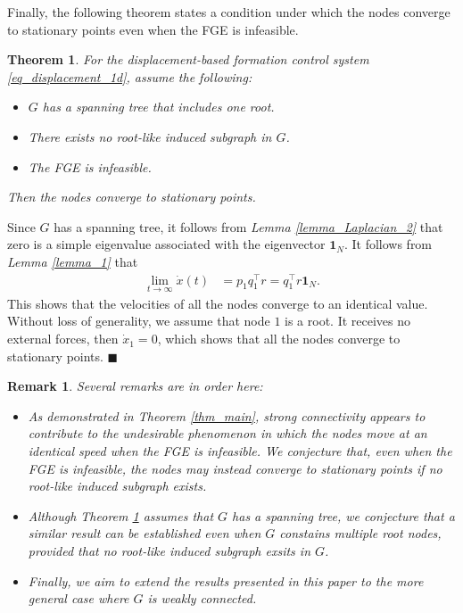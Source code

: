 \documentclass{ifacconf}
\newtheorem{remark}{Remark}[section]
\newtheorem{theorem}{Theorem}[section]
\begin{document}
Finally, the following theorem states a condition under which the nodes converge to stationary points even when the FGE is infeasible.
\begin{theorem} \label{thm_main_2}
For the displacement-based formation control system \eqref{eq_displacement_1d}, assume the following:
\begin{itemize}
\item $G$ has a spanning tree that includes one root.
\item There exists no root-like induced subgraph in $G$.
\item The FGE is infeasible.
\end{itemize}
Then the nodes converge to stationary points.
\end{theorem}
%
%
\begin{pf}
Since $G$ has a spanning tree, it follows from \textit{Lemma \ref{lemma_Laplacian_2}} that zero is a simple eigenvalue associated with the eigenvector $\mathbf{1}_N$. It follows from \textit{Lemma \ref{lemma_1}} that 
\begin{align*}
\lim_{t\rightarrow \infty} \dot{x}(t) &= p_1 q_1^\top r = q_1^\top r  \mathbf{1}_N.
\end{align*}
This shows that the velocities of all the nodes converge to an identical value. Without loss of generality, we assume that node $1$ is a root. It receives no external forces, then $\dot{x}_1 = 0$, which shows that all the nodes converge to stationary points. 
$\blacksquare$
\end{pf}

\begin{remark}
Several remarks are in order here:
\begin{itemize}
\item As demonstrated in \textit{Theorem \ref{thm_main}}, strong connectivity appears to contribute to the undesirable phenomenon in which the nodes move at an identical speed when the FGE is infeasible. We conjecture that, even when the FGE is infeasible, the nodes may instead converge to stationary points if no root-like induced subgraph exists.

\item Although \textit{Theorem \ref{thm_main_2}} assumes that $G$ has a spanning tree, we conjecture that a similar result can be established even when $G$ constains multiple root nodes, provided that no root-like induced subgraph exsits in $G$. 

\item Finally, we aim to extend the results presented in this paper to the more general case where $G$ is weakly connected.
\end{itemize}
\end{remark}
\end{document}
